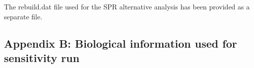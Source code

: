 \documentclass[11pt,
  english,
  a4paper,
]{article}
\begin{document}
\leavevmode\tagmcend\tagstructend


The rebuild.dat file used for the SPR alternative analysis has been provided as a separate file.

\leavevmode\tagmcend\tagstructend\par


\hypertarget{append_b}{%
\subsection{Appendix B: Biological information used for sensitivity run}\label{append_b}}

\leavevmode\tagmcend\tagstructend
\end{document}
